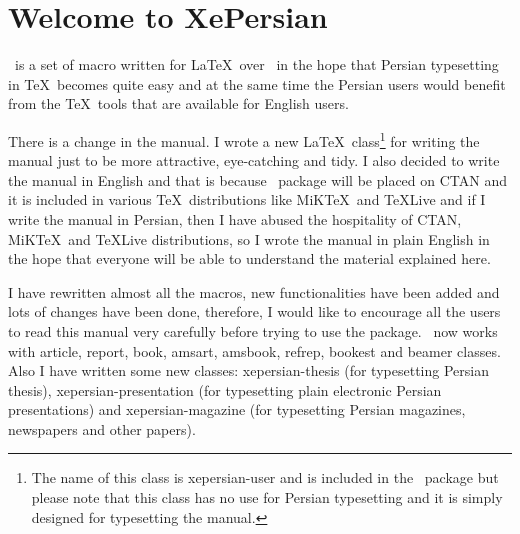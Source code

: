 \part*{Welcome to XePersian}
\XePersian\  is a set of macro written for \LaTeX\ over \XeTeX\ in the hope that Persian typesetting in \TeX\ becomes quite easy and at the same time the Persian users would benefit from the \TeX\ tools that are available for English users. 

There is a change in the manual. I wrote a new \LaTeX\ class\footnote{The name of this class is \textsf{xepersian-user} and is included in the \XePersian\ package but please note that this class has no use for Persian typesetting and it is simply designed for typesetting the manual.} for writing the manual just to be more attractive, eye-catching and tidy. I also decided to write the manual in English and that is because \XePersian\ package will be placed on CTAN and it is included in  various \TeX\ distributions like MiK\TeX\ and \TeX Live and if I write the manual in Persian, then I have abused the hospitality of CTAN, MiK\TeX\ and \TeX Live distributions, so I wrote the manual in plain English in the hope that everyone will be  able to understand the material explained here. 

I have rewritten almost all the macros, new functionalities have been added and lots of changes have been done, therefore, I would like to encourage all the users to read this manual very carefully before trying to use the package. \XePersian\ now works with \textsf{article}, \textsf{report}, \textsf{book}, \textsf{amsart}, \textsf{amsbook}, \textsf{refrep}, \textsf{bookest} and \textsf{beamer}  classes. Also I have written some new classes: \textsf{xepersian-thesis} (for typesetting Persian thesis), \textsf{xepersian-presentation} (for typesetting plain electronic Persian presentations) and \textsf{xepersian-magazine} (for typesetting Persian magazines, newspapers and other papers).

